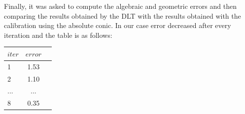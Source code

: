 \documentclass[]{article}
\begin{document}
\vspace{0.5em}

Finally, it was asked to compute the algebraic and geometric errors and then comparing the results obtained by the DLT with the results obtained with the calibration using the absolute conic. In our case error decreased after every iteration and the table is as follows:

\begin{table}[h!]
	\begin{center}
		\label{tab:table1}
		\begin{tabular}{l|c|r} 
			$iter$ & $error$ \\
			\hline
			1 & 1.53 \\
			2 & 1.10 \\
			... & ... \\
			8 & 0.35 \\
		\end{tabular}
	\end{center}
\end{table}
\end{document}

